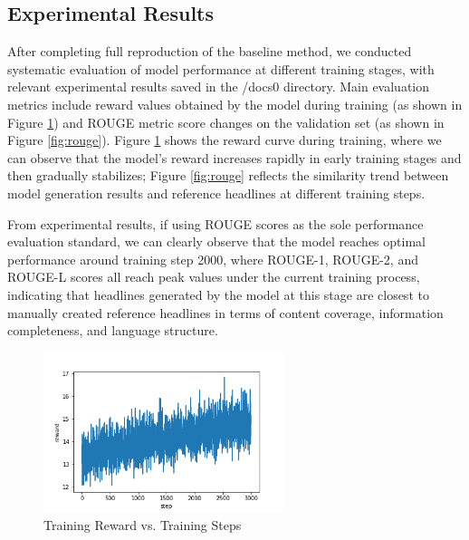 \documentclass[10pt,a4paper]{article}
\begin{document}
\subsection{Experimental Results}
After completing full reproduction of the baseline method, we conducted systematic evaluation of model performance at different training stages, with relevant experimental results saved in the /docs0 directory. Main evaluation metrics include reward values obtained by the model during training (as shown in Figure \ref{fig:reward}) and ROUGE metric score changes on the validation set (as shown in Figure \ref{fig:rouge}). Figure \ref{fig:reward} shows the reward curve during training, where we can observe that the model's reward increases rapidly in early training stages and then gradually stabilizes; Figure \ref{fig:rouge} reflects the similarity trend between model generation results and reference headlines at different training steps.

From experimental results, if using ROUGE scores as the sole performance evaluation standard, we can clearly observe that the model reaches optimal performance around training step 2000, where ROUGE-1, ROUGE-2, and ROUGE-L scores all reach peak values under the current training process, indicating that headlines generated by the model at this stage are closest to manually created reference headlines in terms of content coverage, information completeness, and language structure.

\begin{figure}[H]
  \centering
  \includegraphics[width=7cm]{fig/reward.png}
  \caption{Training Reward vs. Training Steps}\label{fig:reward}
\end{figure}
\end{document}
